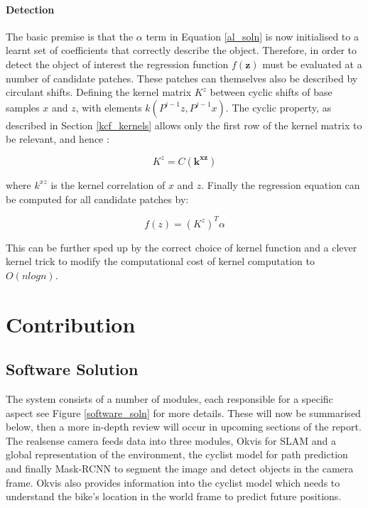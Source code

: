 \documentclass[11pt,twoside]{report}
\begin{document}
\subsubsection{Detection}

The basic premise is that the $\alpha$ term in Equation \ref{al_soln} is now initialised to a learnt set of coefficients that correctly describe the object. Therefore, in order to detect the object of interest the regression function $f(\mathbf{z})$ must be evaluated at a number of candidate patches.  These patches can themselves also be described by circulant shifts. Defining the kernel matrix $K^{z}$ between cyclic shifts of base samples $x$ and $z$, with elements $k(P^{i-1}z,P^{j-1}x)$. The cyclic property, as described in Section \ref{kcf_kernels} allows only the first row of the kernel matrix to be relevant, and hence :

\begin{equation}
K^{z} = C(\mathbf{k^{xz}})
\end{equation}

where $k^{xz}$ is the kernel correlation of $x$ and $z$. Finally the regression equation can be computed for all candidate patches by:

\begin{equation}
f(z) = (K^{z})^{T} \alpha
\end{equation}

This can be further sped up by the correct choice of kernel function and a clever kernel trick to modify the computational cost of kernel computation to $O(nlogn)$. 

\chapter{Contribution}


\section{Software Solution}
The system consists of a number of modules, each responsible for a specific aspect see Figure \ref{software_soln} for more details. These will now be summarised below, then a more in-depth review will occur in upcoming sections of the report. The realsense camera feeds data into three modules, Okvis for SLAM and a global representation of the environment, the cyclist model for path prediction and finally Mask-RCNN to segment the image and detect objects in the camera frame. Okvis also provides information into the cyclist model which needs to understand the bike's location in the world frame to predict future positions.
\end{document}
